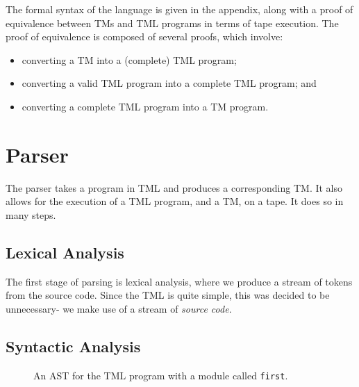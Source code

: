 The formal syntax of the language is given in the appendix, along with a proof of equivalence between TMs and TML programs in terms of tape execution. The proof of equivalence is composed of several proofs, which involve:
\begin{itemize}
    \item converting a TM into a (complete) TML program;
    \item converting a valid TML program into a complete TML program; and
    \item converting a complete TML program into a TM program.
\end{itemize}

\section{Parser}
The parser takes a program in TML and produces a corresponding TM. It also allows for the execution of a TML program, and a TM, on a tape. It does so in many steps.

\subsection{Lexical Analysis}
The first stage of parsing is lexical analysis, where we produce a stream of tokens from the source code. Since the TML is quite simple, this was decided to be unnecessary- we make use of a stream of \emph{source code}.

\subsection{Syntactic Analysis}

\begin{figure}[htb]
    \centering
    \caption{An AST for the TML program with a module called \texttt{first}.}
    \label{fig:TML_AST}
\end{figure}

